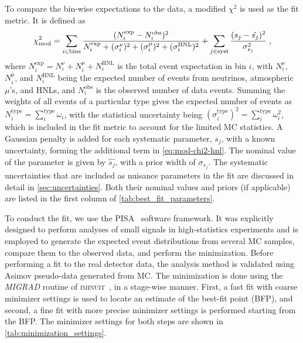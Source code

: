 \documentclass[
    aps,
    prd,
    reprint,
    amsmath,
    amssymb,
    nofootinbib,
    linenumbers,
    superscriptaddress,
    floatfix
]{revtex4-2}
\renewcommand{\rm}{\mathrm}
\newcommand{\rm}{\mathrm}
\begin{document}
To compare the bin-wise expectations to the data, a modified $\chi^2$ is used as the fit metric. It is defined as
\begin{equation}
    \footnotesize
    \chi^2_{\mathrm{mod}} =
    \sum_{i \in \mathrm{bins}}^{}\frac{(N^{\rm{exp}}_i - N^{\mathrm{obs}}_i)^2}{N^{\rm{exp}}_i + (\sigma^{\mathrm{\nu}}_i)^2 + (\sigma^{\mathrm{\mu}}_i)^2 + (\sigma^{\mathrm{HNL}}_i)^2}
    + \sum_{j \in \mathrm{syst}}^{}\frac{(s_j - \hat{s_j})^2}{\sigma^2_{s_j}}
    \;,
    \label{eq:mod-chi2-hnl}
\end{equation}
where $N^{\rm{exp}}_i = N^{\mathrm{\nu}}_i + N^{\mathrm{\mu}}_i + N^{\mathrm{HNL}}_i$ is the total event expectation in bin $i$, with $N^{\mathrm{\nu}}_i$, $N^{\mathrm{\mu}}_i$, and $N^{\mathrm{HNL}}_i$ being the expected number of events from neutrinos, atmospheric $\mu$'s, and HNLs, and $N^{\mathrm{obs}}_i$ is the observed number of data events. Summing the weights of all events of a particular type gives the expected number of events as $N^{\mathrm{type}}_i = \sum_i^\rm{type}\omega_i$, with the statistical uncertainty being $(\sigma^{\mathrm{type}}_i)^2 = \sum_i^\rm{type}\omega_i^2$, which is included in the fit metric to account for the limited MC statistics. A Gaussian penalty is added for each systematic parameter, $s_j$, with a known uncertainty, forming the additional term in \cref{eq:mod-chi2-hnl}. The nominal value of the parameter is given by $\hat{s_j}$, with a prior width of $\sigma_{s_j}$. The systematic uncertainties that are included as nuisance parameters in the fit are discussed in detail in \cref{sec:uncertainties}. Both their nominal values and priors (if applicable) are listed in the first column of \cref{tab:best_fit_parameters}.

To conduct the fit, we use the \textsc{PISA}~\cite{pisa_paper, pisa_software} software framework.
It was explicitly designed to perform analyses of small signals in high-statistics experiments and is employed to generate the expected event distributions from several MC samples, compare them to the observed data, and perform the minimization.
Before performing a fit to the real detector data, the analysis method is validated using Asimov pseudo-data generated from MC.
The minimization is done using the \textit{MIGRAD} routine of \textsc{iminuit}~\cite{iminuit_v2.17.0}, in  a stage-wise manner.
First, a fast fit with coarse minimizer settings is used to locate an estimate of the best-fit point (BFP), and second, a fine fit with more precise minimizer settings is performed starting from the BFP. The minimizer settings for both steps are shown in \cref{tab:minimization_settings}.
\end{document}
